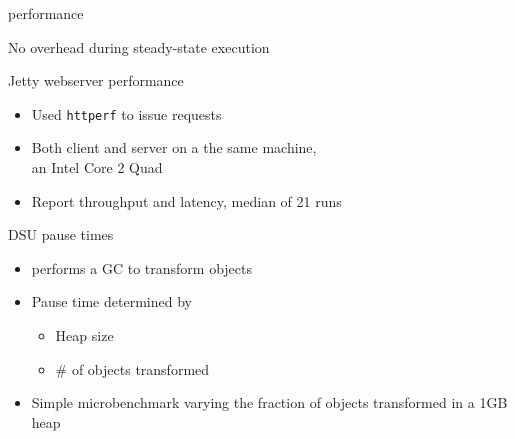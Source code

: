 \begin{frame}{\DSU{} performance}%
\begin{center}
{\Large No overhead during steady-state execution}
\end{center}
\vspace{1ex}
\begin{center}
%
\end{center}
\end{frame}

\begin{frame}{Jetty webserver performance}%
\begin{itemize}
\item Used \texttt{httperf} to issue requests
\item Both client and server on a the same machine, \\
an Intel Core 2 Quad
\item Report throughput and latency, median of 21 runs
\end{itemize}
\end{frame}


\begin{frame}{DSU pause times}%
\begin{itemize}
\item \DSU{} performs a GC to transform objects
\item Pause time determined by
  \begin{itemize}
  \item Heap size
  \item \# of objects transformed
  \end{itemize}
\item Simple microbenchmark varying the fraction of objects transformed in
a 1GB heap
\end{itemize}
\end{frame}

